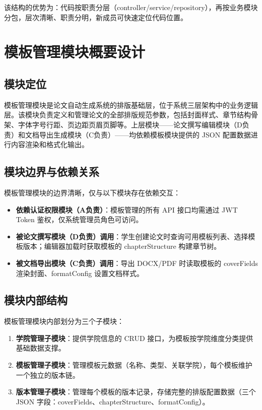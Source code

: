 \documentclass{../../softeng}
\begin{document}
该结构的优势为：代码按职责分层（controller/service/repository），再按业务模块分包，层次清晰、职责分明，新成员可快速定位代码位置。

\section{模板管理模块概要设计}

\subsection{模块定位}

模板管理模块是论文自动生成系统的排版基础层，位于系统三层架构中的业务逻辑层。该模块负责定义和管理论文的全部排版规范参数，包括封面样式、章节结构骨架、字体字号行距、页边距页眉页脚等。上层模块——论文撰写编辑模块（D负责）和文档导出生成模块（C负责）——均依赖模板模块提供的 JSON 配置数据进行内容渲染和格式化输出。

\subsection{模块边界与依赖关系}

模板管理模块的边界清晰，仅与以下模块存在依赖交互：

\begin{itemize}
    \item \textbf{依赖认证权限模块（A负责）}：模板管理的所有 API 接口均需通过 JWT Token 鉴权，仅系统管理员角色可访问。
    \item \textbf{被论文撰写模块（D负责）调用}：学生创建论文时查询可用模板列表、选择模板版本；编辑器加载时获取模板的 chapterStructure 构建章节树。
    \item \textbf{被文档导出模块（C负责）调用}：导出 DOCX/PDF 时读取模板的 coverFields 渲染封面、formatConfig 设置文档样式。
\end{itemize}

\subsection{模块内部结构}

模板管理模块内部划分为三个子模块：

\begin{enumerate}
    \item \textbf{学院管理子模块}：提供学院信息的 CRUD 接口，为模板按学院维度分类提供基础数据支撑。
    \item \textbf{模板管理子模块}：管理模板元数据（名称、类型、关联学院），每个模板维护一个独立的版本链。
    \item \textbf{版本管理子模块}：管理每个模板的版本记录，存储完整的排版配置数据（三个 JSON 字段：coverFields、chapterStructure、formatConfig）。
\end{enumerate}
\end{document}
